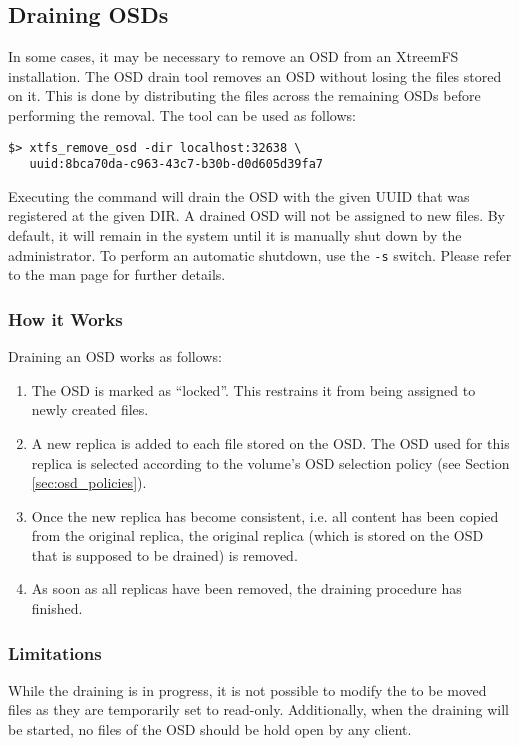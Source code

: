 \documentclass[a4paper,10pt]{book}
\begin{document}
\subsection{Draining OSDs}

In some cases, it may be necessary to remove an OSD from an XtreemFS installation. The OSD drain tool removes an OSD without losing the files stored on it. This is done by distributing the files across the remaining OSDs before performing the removal. The tool can be used as follows:

\begin{verbatim}
$> xtfs_remove_osd -dir localhost:32638 \
   uuid:8bca70da-c963-43c7-b30b-d0d605d39fa7
\end{verbatim}

Executing the command will drain the OSD with the given UUID that was registered at the given DIR. A drained OSD will not be assigned to new files. By default, it will remain in the system until it is manually shut down by the administrator. To perform an automatic shutdown, use the \texttt{-s} switch. Please refer to the man page for further details.

\subsubsection{How it Works}

Draining an OSD works as follows:
\begin{enumerate}
 \item The OSD is marked as ``locked''. This restrains it from being assigned to newly created files.
 \item A new replica is added to each file stored on the OSD. The OSD used for this replica is selected according to the volume's OSD selection policy (see Section \ref{sec:osd_policies}).
 \item Once the new replica has become consistent, i.e. all content has been copied from the original replica, the original replica (which is stored on the OSD that is supposed to be drained) is removed.
 \item As soon as all replicas have been removed, the draining procedure has finished.
\end{enumerate}

\subsubsection{Limitations}

While the draining is in progress, it is not possible to modify the to be moved files as they are temporarily set to read-only. Additionally, when the draining will be started, no files of the OSD should be hold open by any client.
\end{document}

